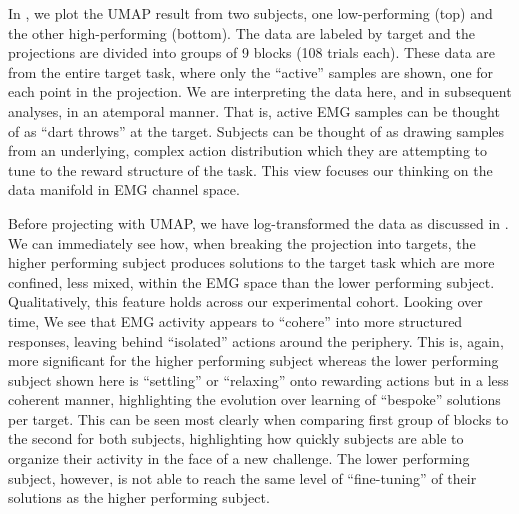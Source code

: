 \documentclass[../main.tex]{subfiles}
\begin{document}




In , we plot the UMAP result from two subjects, one low-performing (top) and the other high-performing (bottom). The data are labeled by target and the projections are divided into groups of 9 blocks (108 trials each). These data are from the entire target task, where only the ``active'' samples are shown, one for each point in the projection. We are interpreting the data here, and in subsequent analyses, in an atemporal manner. That is, active EMG samples can be thought of as ``dart throws'' at the target. Subjects can be thought of as drawing samples from an underlying, complex action distribution which they are attempting to tune to the reward structure of the task. This view focuses our thinking on the data manifold in EMG channel space.

Before projecting with UMAP, we have log-transformed the data as discussed in . We can immediately see how, when breaking the projection into targets, the higher performing subject produces solutions to the target task which are more confined, less mixed, within the EMG space than the lower performing subject. Qualitatively, this feature holds across our experimental cohort. Looking over time, We see that EMG activity appears to ``cohere'' into more structured responses, leaving behind ``isolated'' actions around the periphery. This is, again, more significant for the higher performing subject whereas the lower performing subject shown here is ``settling'' or ``relaxing'' onto rewarding actions but in a less coherent manner, highlighting the evolution over learning of ``bespoke'' solutions per target. This can be seen most clearly when comparing first group of blocks to the second for both subjects, highlighting how quickly subjects are able to organize their activity in the face of a new challenge. The lower performing subject, however, is not able to reach the same level of ``fine-tuning'' of their solutions as the higher performing subject.
\end{document}
